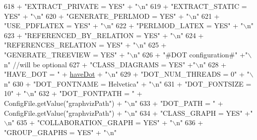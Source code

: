 \begin{DoxyCode}
618                     + \textcolor{stringliteral}{"EXTRACT\_PRIVATE = YES"} + \textcolor{stringliteral}{"\(\backslash\)n"}
619                     + \textcolor{stringliteral}{"EXTRACT\_STATIC = YES"} + \textcolor{stringliteral}{"\(\backslash\)n"}
620                     + \textcolor{stringliteral}{"GENERATE\_PERLMOD = YES"} + \textcolor{stringliteral}{"\(\backslash\)n"}
621                     + \textcolor{stringliteral}{"USE\_PDFLATEX = YES"} + \textcolor{stringliteral}{"\(\backslash\)n"}
622                     + \textcolor{stringliteral}{"PERLMOD\_LATEX = YES"} + \textcolor{stringliteral}{"\(\backslash\)n"}
623                     + \textcolor{stringliteral}{"REFERENCED\_BY\_RELATION = YES"} + \textcolor{stringliteral}{"\(\backslash\)n"}
624                     + \textcolor{stringliteral}{"REFERENCES\_RELATION = YES"} + \textcolor{stringliteral}{"\(\backslash\)n"}
625                     + \textcolor{stringliteral}{"GENERATE\_TREEVIEW = YES"} + \textcolor{stringliteral}{"\(\backslash\)n"}
626                     + \textcolor{stringliteral}{"#DOT configuration#"} +\textcolor{stringliteral}{"\(\backslash\)n"}   \textcolor{comment}{//will be optional}
627                     + \textcolor{stringliteral}{"CLASS\_DIAGRAMS = YES"} +\textcolor{stringliteral}{"\(\backslash\)n"}
628                     + \textcolor{stringliteral}{"HAVE\_DOT = "} + \hyperlink{classit_1_1isislab_1_1masonassisteddocumentation_1_1mason_1_1analizer_1_1_global_utility_a396066731dbc923fe85d28988511ba46}{haveDot} + \textcolor{stringliteral}{"\(\backslash\)n"}
629                     + \textcolor{stringliteral}{"DOT\_NUM\_THREADS = 0"} + \textcolor{stringliteral}{"\(\backslash\)n"}
630                     + \textcolor{stringliteral}{"DOT\_FONTNAME = Helvetica"} + \textcolor{stringliteral}{"\(\backslash\)n"}
631                     + \textcolor{stringliteral}{"DOT\_FONTSIZE = 10"} + \textcolor{stringliteral}{"\(\backslash\)n"}
632                     + \textcolor{stringliteral}{"DOT\_FONTPATH = "} + ConfigFile.getValue(\textcolor{stringliteral}{"graphvizPath"}) + \textcolor{stringliteral}{"\(\backslash\)n"}
633                     + \textcolor{stringliteral}{"DOT\_PATH = "} + ConfigFile.getValue(\textcolor{stringliteral}{"graphvizPath"}) + \textcolor{stringliteral}{"\(\backslash\)n"}
634                     + \textcolor{stringliteral}{"CLASS\_GRAPH = YES"} +\textcolor{stringliteral}{"\(\backslash\)n"}
635                     + \textcolor{stringliteral}{"COLLABORATION\_GRAPH = YES"} + \textcolor{stringliteral}{"\(\backslash\)n"}
636                     + \textcolor{stringliteral}{"GROUP\_GRAPHS = YES"} + \textcolor{stringliteral}{"\(\backslash\)n"}

\end{DoxyCode}
